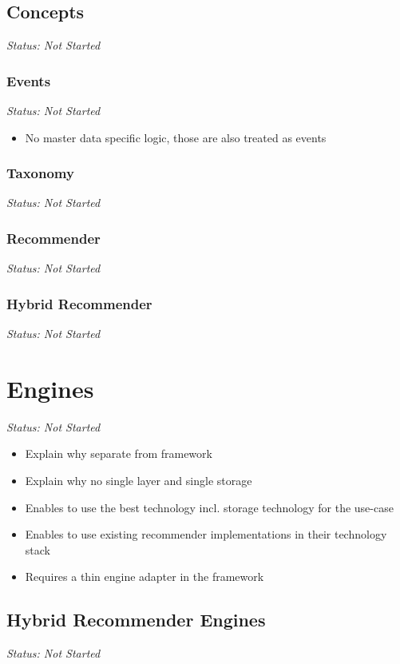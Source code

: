 \subsection{Concepts}

\emph{Status: Not Started}

\subsubsection{Events}

\emph{Status: Not Started}

\begin{itemize}
\item No master data specific logic, those are also treated as events
\end{itemize}

\subsubsection{Taxonomy}

\emph{Status: Not Started}

\subsubsection{Recommender}

\emph{Status: Not Started}

\subsubsection{Hybrid Recommender}

\emph{Status: Not Started}

\section{Engines}

\emph{Status: Not Started}

\begin{itemize}
\item Explain why separate from framework
\item Explain why no single layer and single storage
\item Enables to use the best technology incl. storage technology for the use-case
\item Enables to use existing recommender implementations in their technology stack
\item Requires a thin engine adapter in the framework
\end{itemize}

\subsection{Hybrid Recommender Engines}

\emph{Status: Not Started}